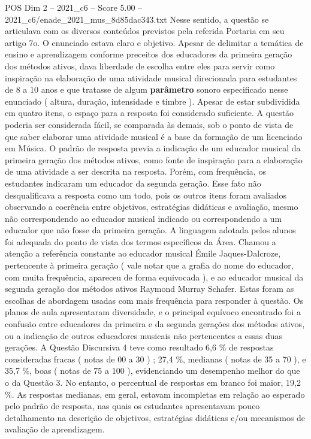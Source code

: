 \begin{textsample}{POS Dim 2 – 2021\_c6 – Score 5.00 – 2021\_c6/enade\_2021\_mus\_8d85dac343.txt}
Nesse sentido, a questão se articulava com os diversos conteúdos previstos pela referida Portaria em seu artigo 7o.
O enunciado estava claro e objetivo.
Apesar de delimitar a temática de ensino e aprendizagem conforme preceitos dos educadores da primeira geração dos métodos ativos, dava liberdade de escolha entre eles para servir como inspiração na elaboração de uma atividade musical direcionada para estudantes de 8 a 10 anos e que tratasse de algum \textbf{parâmetro} sonoro especificado nesse enunciado ( altura, duração, intensidade e timbre ).
Apesar de estar subdividida em quatro itens, o espaço para a resposta foi considerado suficiente.
A questão poderia ser considerada fácil, se comparada às demais, sob o ponto de vista de que saber elaborar uma atividade musical é a base da formação de um licenciado em Música.
O padrão de resposta previa a indicação de um educador musical da primeira geração dos métodos ativos, como fonte de inspiração para a elaboração de uma atividade a ser descrita na resposta.
Porém, com frequência, os estudantes indicaram um educador da segunda geração.
Esse fato não desqualificava a resposta como um todo, pois os outros itens foram avaliados observando a coerência entre objetivos, estratégias didáticas e avaliação, mesmo não correspondendo ao educador musical indicado ou correspondendo a um educador que não fosse da primeira geração.
A linguagem adotada pelos alunos foi adequada do ponto de vista dos termos específicos da Área.
Chamou a atenção a referência constante ao educador musical Émile Jaques-Dalcroze, pertencente à primeira geração ( vale notar que a grafia do nome do educador, com muita frequência, apareceu de forma equivocada ), e ao educador musical da segunda geração dos métodos ativos Raymond Murray Schafer.
Estas foram as escolhas de abordagem usadas com mais frequência para responder à questão.
Os planos de aula apresentaram diversidade, e o principal equívoco encontrado foi a confusão entre educadores da primeira e da segunda gerações dos métodos ativos, ou a indicação de outros educadores musicais não pertencentes a essas duas gerações.
A Questão Discursiva 4 teve como resultado 6,6 \% de respostas consideradas fracas ( notas de 00 a 30 ) ; 27,4 \%, medianas ( notas de 35 a 70 ), e 35,7 \%, boas ( notas de 75 a 100 ), evidenciando um desempenho melhor do que o da Questão 3.
No entanto, o percentual de respostas em branco foi maior, 19,2 \%.
As respostas medianas, em geral, estavam incompletas em relação ao esperado pelo padrão de resposta, nas quais os estudantes apresentavam pouco detalhamento na descrição de objetivos, estratégias didáticas e/ou mecanismos de avaliação de aprendizagem.

\end{textsample}
